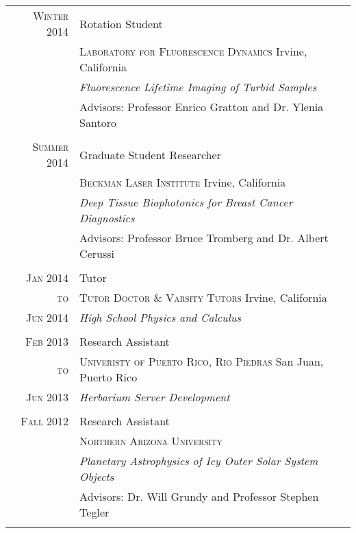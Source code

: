 \documentclass[letterpaper,10pt]{article} %
\begin{document}
\begin{tabular}{r|p{11cm}}

\textsc{Winter 2014} & Rotation Student \\
& \textsc{Laboratory for Fluorescence Dynamics} Irvine, California\\
&\emph{Fluorescence Lifetime Imaging of Turbid Samples}\\
& Advisors: Professor Enrico Gratton and Dr. Ylenia Santoro \\

\multicolumn{2}{c}{} \\


\textsc{Summer 2014} & Graduate Student Researcher \\
& \textsc{Beckman Laser Institute} Irvine, California\\
&\emph{Deep Tissue Biophotonics for Breast Cancer Diagnostics}\\ 
& Advisors: Professor Bruce Tromberg and Dr. Albert Cerussi \\

\multicolumn{2}{c}{} \\


\textsc{Jan 2014} & Tutor \\
\textsc{to} & \textsc{Tutor Doctor \& Varsity Tutors} Irvine, California\\
\textsc{Jun 2014} &\emph{High School Physics and Calculus}\\ 

\multicolumn{2}{c}{} \\


\textsc{Feb 2013} & Research Assistant  \\
\textsc{to} & \textsc{Univeristy of Puerto Rico, Rio Piedras} San Juan, Puerto Rico\\
\textsc{Jun 2013} & \emph{Herbarium Server Development}\\ 

\multicolumn{2}{c}{}\\


\textsc{Fall 2012} & Research Assistant \\
& \textsc{Northern Arizona University} \\
&\emph{Planetary Astrophysics of Icy Outer Solar System Objects}\\ 
& Advisors: Dr. Will Grundy and Professor Stephen Tegler \\
\multicolumn{2}{c}{} \\


\end{tabular}
\end{document}
